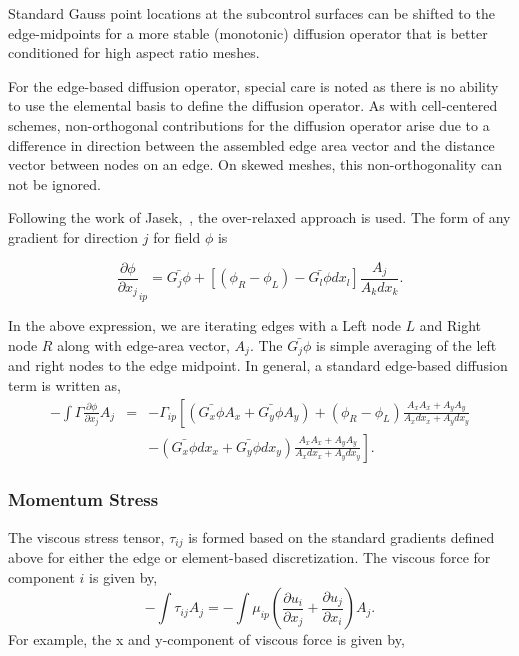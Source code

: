 Standard Gauss point locations at the subcontrol surfaces can be shifted to the edge-midpoints for a more stable (monotonic)
diffusion operator that is better conditioned for high aspect ratio meshes. 

For the edge-based diffusion operator, special care is noted
as there is no ability to use the elemental basis to define
the diffusion operator. As with cell-centered schemes, non-orthogonal 
contributions for the diffusion operator arise due to a difference in
direction between the assembled edge area vector and the
distance vector between nodes on an edge. On skewed meshes,
this non-orthogonality can not be ignored.

Following the work of Jasek,~\cite{Jasek:1996},
the over-relaxed approach is used. The form of any gradient
for direction $j$ for field $\phi$ is

\begin{equation}
  \frac{\partial \phi}{\partial x_j}_{ip} = \bar{G_j\phi} + \left[ \left(\phi_R - \phi_L \right) 
- \bar{G_l\phi}dx_l \right] \frac{A_j}{A_k dx_k}.
\end{equation}
\label{generalGrad}

In the above expression, we are iterating edges with a Left node $L$ and Right node $R$ along
with edge-area vector, $A_j$. The $\bar{G_j \phi}$ is simple averaging of the left and right nodes
to the edge midpoint. 
In general, a standard edge-based diffusion term is written as,
\begin{eqnarray}
  -\int \Gamma \frac{\partial \phi}{\partial x_j} A_j &=& - \Gamma_{ip} \left[ \left(\bar{G_x \phi}A_x + \bar{G_y \phi}A_y \right)
    + \left( \phi_R -  \phi_L \right) \frac{A_x A_x + A_y A_y}{A_x dx_x + A_y dx_y} \right. \nonumber \\ &&
  - \left. \left( \bar{G_x \phi}dx_x + \bar{G_y \phi}dx_y \right) \frac{A_x A_x + A_y A_y} {A_x dx_x + A_y dx_y} \right].
\end{eqnarray}

\subsubsection{Momentum Stress}
The viscous stress tensor, $\tau_{ij}$ is formed based on the
standard gradients defined above for either the edge or element-based 
discretization. The viscous force for component $i$ is given by,
\begin{equation}
  -\int \tau_{ij} A_j = -\int \mu_{ip}\left( \frac{\partial u_i}{\partial x_j} + \frac{\partial u_j}{\partial x_i} \right) A_j.
\end{equation}
\label{viscousStress}
%
For example, the x and y-component of viscous force is 
given by,

